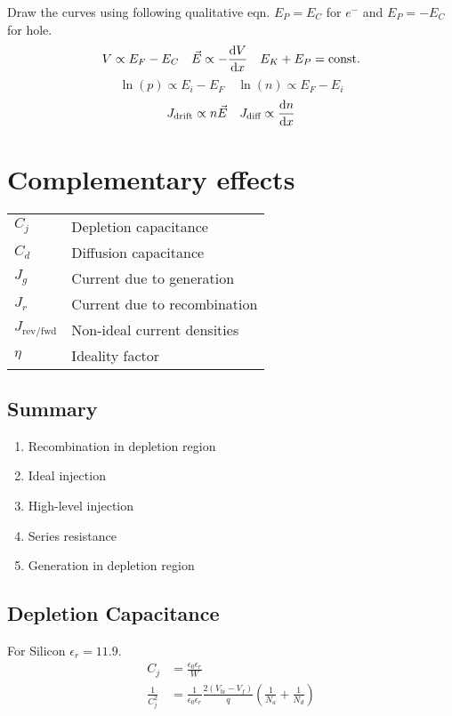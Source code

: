 \documentclass[a4paper, fontsize=8pt, landscape, DIV=1]{scrartcl}
\begin{document}
\begin{multicols*}{4}
    Draw the curves using following qualitative eqn. $E_P=E_C$ for $e^-$ and $E_P=-E_C$ for hole.
    \[ V \propto E_F - E_C \quad \vec{E} \propto -\frac{\mathrm{d}V}{\mathrm{d}x} \quad E_K + E_P = \text{const.} \]
    \[ \ln(p) \propto E_i-E_F \quad \ln(n) \propto E_F-E_i \]
    \[ J_{\text{drift}} \propto n\vec{E} \quad J_{\text{diff}} \propto \frac{\mathrm{d}n}{\mathrm{d}x} \]

    \section{Complementary effects}
  \ifdefined\makeultracompact
  \else
    \begin{tabular}[h]{l l}
      $C_j$   & Depletion capacitance \\
      $C_d$   & Diffusion capacitance \\
      $J_g$   & Current due to generation \\
      $J_r$   & Current due to recombination \\
      $J_{\text{rev/fwd}}$ & Non-ideal current densities \\
      $\eta$  & Ideality factor \\
    \end{tabular}
  \fi

    \subsection{Summary}
    \renewcommand{\labelenumi}{\alph{enumi})}
    \setlength{\fboxsep}{1pt}
    \begin{enumerate}[topsep=0pt,itemsep=-1ex,partopsep=1ex,parsep=1ex]
    \item \colorbox[rgb]{0.99,0.90,0.77}{Recombination in depletion region}
    \item \colorbox[rgb]{0.84,0.93,0.81}{Ideal injection}
    \item \colorbox[rgb]{0.75,0.85,0.99}{High-level injection}
    \item \colorbox[rgb]{0.89,0.75,0.93}{Series resistance}
    \item \colorbox[rgb]{0.98,0.79,0.78}{Generation in depletion region}
    \end{enumerate}

    
    \subsection{Depletion Capacitance}
    For Silicon $\epsilon_r = 11.9$.
    \begin{align*}
      C_j &= \frac{\epsilon_0\epsilon_r}{W} \\
      \frac{1}{C_j^2} &= \frac{1}{\epsilon_0\epsilon_r} \frac{2(V_{bi}-V_f)}{q} \left( \frac{1}{N_a} + \frac{1}{N_d}\right) \\
    \end{align*}


\end{multicols*}
\end{document}

